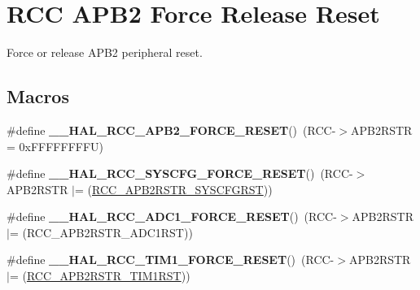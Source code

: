 \hypertarget{group___r_c_c___a_p_b2___force___release___reset}{}\section{R\+CC A\+P\+B2 Force Release Reset}
\label{group___r_c_c___a_p_b2___force___release___reset}


Force or release A\+P\+B2 peripheral reset.  


\subsection*{Macros}
\begin{DoxyCompactItemize}
\item 
\mbox{\label{group___r_c_c___a_p_b2___force___release___reset_ga8788da8c644ad0cc54912baede7d49b4}} 
\#define {\bfseries \+\_\+\+\_\+\+H\+A\+L\+\_\+\+R\+C\+C\+\_\+\+A\+P\+B2\+\_\+\+F\+O\+R\+C\+E\+\_\+\+R\+E\+S\+ET}()~(R\+CC-\/$>$A\+P\+B2\+R\+S\+TR = 0x\+F\+F\+F\+F\+F\+F\+F\+F\+U)
\item 
\mbox{\label{group___r_c_c___a_p_b2___force___release___reset_ga143ff27d8f59a39732efd79539e3765a}} 
\#define {\bfseries \+\_\+\+\_\+\+H\+A\+L\+\_\+\+R\+C\+C\+\_\+\+S\+Y\+S\+C\+F\+G\+\_\+\+F\+O\+R\+C\+E\+\_\+\+R\+E\+S\+ET}()~(R\+CC-\/$>$A\+P\+B2\+R\+S\+TR $\vert$= (\hyperlink{group___peripheral___registers___bits___definition_ga813d42b8d48ae6379c053a44870af49d}{R\+C\+C\+\_\+\+A\+P\+B2\+R\+S\+T\+R\+\_\+\+S\+Y\+S\+C\+F\+G\+R\+ST}))
\item 
\mbox{\label{group___r_c_c___a_p_b2___force___release___reset_ga6176fa4f52de6ebf932d99a4d611634d}} 
\#define {\bfseries \+\_\+\+\_\+\+H\+A\+L\+\_\+\+R\+C\+C\+\_\+\+A\+D\+C1\+\_\+\+F\+O\+R\+C\+E\+\_\+\+R\+E\+S\+ET}()~(R\+CC-\/$>$A\+P\+B2\+R\+S\+TR $\vert$= (R\+C\+C\+\_\+\+A\+P\+B2\+R\+S\+T\+R\+\_\+\+A\+D\+C1\+R\+ST))
\item 
\mbox{\label{group___r_c_c___a_p_b2___force___release___reset_gac423d6a52fa42423119844e4a7d68c7b}} 
\#define {\bfseries \+\_\+\+\_\+\+H\+A\+L\+\_\+\+R\+C\+C\+\_\+\+T\+I\+M1\+\_\+\+F\+O\+R\+C\+E\+\_\+\+R\+E\+S\+ET}()~(R\+CC-\/$>$A\+P\+B2\+R\+S\+TR $\vert$= (\hyperlink{group___peripheral___registers___bits___definition_ga5bd060cbefaef05487963bbd6c48d7c6}{R\+C\+C\+\_\+\+A\+P\+B2\+R\+S\+T\+R\+\_\+\+T\+I\+M1\+R\+ST}))

\end{DoxyCompactItemize}
